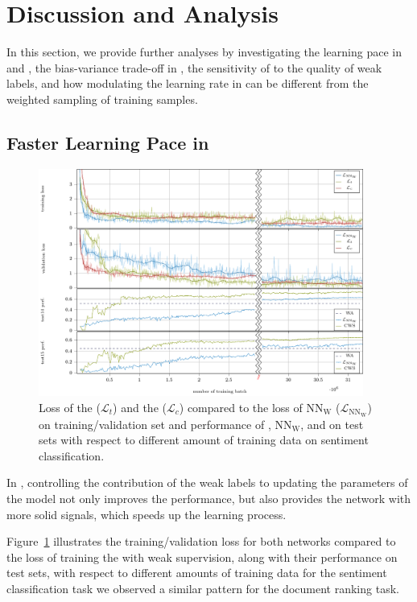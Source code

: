 \section{Discussion and Analysis}
\label{sec:discussion}
\shrink
In this section, we provide further analyses by investigating the learning pace in \cws and \fwl, the bias-variance trade-off in \fwl, the sensitivity of \fwl to the quality of weak labels, and how modulating the learning rate in \fwl can be different from the weighted sampling of training samples.

\subsection{Faster Learning Pace in \cws}
\label{sec:learning_pace}
\begin{figure}[!t]%
    \centering
    \includegraphics[width=0.95\textwidth]{03-part-02/chapter-05/figs_and_tables/plot_loss_cws.pdf}
    \caption{Loss of the \tnet ($\mathcal{L}_t$) and the \cnet ($\mathcal{L}_c$) compared to the loss of $\text{NN}_{\text{W}}$ ($\mathcal{L}_{\text{NN}_{\text{W}}}$) on training/validation set and performance of \cws, $\text{NN}_{\text{W}}$, and \wa on test sets with respect to different amount of training data on sentiment classification.}
    \label{fig:plot_loss_cws}
\end{figure}
In \cws, controlling the contribution of the weak labels to updating the parameters of the model not only improves the performance, but also provides the network with more solid signals, which speeds up the learning process. 

Figure~\ref{fig:plot_loss_cws} illustrates the training/validation loss for both networks compared to the loss of training the \tnet with weak supervision, along with their performance on test sets, with respect to different amounts of training data for the sentiment classification task we observed a similar pattern for the document ranking task.

